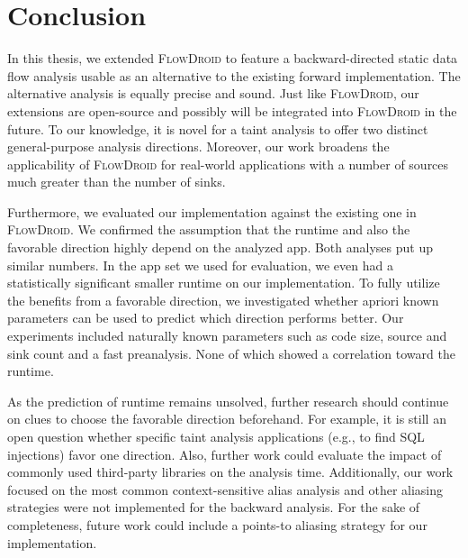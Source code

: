 \documentclass[../draft.tex]{subfiles}
\begin{document}
    \chapter{Conclusion}\label{c:conclusion}
    In this thesis, we extended \textsc{FlowDroid} to feature a backward-directed static data flow analysis usable as an alternative to the existing forward implementation.
    The alternative analysis is equally precise and sound.
    Just like \textsc{FlowDroid}, our extensions are open-source and possibly will be integrated into \textsc{FlowDroid} in the future.
    To our knowledge, it is novel for a taint analysis to offer two distinct general-purpose analysis directions.
    Moreover, our work broadens the applicability of \textsc{FlowDroid} for real-world applications with a number of sources much greater than the number of sinks.

    Furthermore, we evaluated our implementation against the existing one in \textsc{FlowDroid}.
    We confirmed the assumption that the runtime and also the favorable direction highly depend on the analyzed app.
    Both analyses put up similar numbers.
    In the app set we used for evaluation, we even had a statistically significant smaller runtime on our implementation.
    To fully utilize the benefits from a favorable direction, we investigated whether apriori known parameters can be used to predict which direction performs better.
    Our experiments included naturally known parameters such as code size, source and sink count and a fast preanalysis.
    None of which showed a correlation toward the runtime.

    As the prediction of runtime remains unsolved, further research should continue on clues to choose the favorable direction beforehand.
    For example, it is still an open question whether specific taint analysis applications (e.g., to find SQL injections) favor one direction.
    Also, further work could evaluate the impact of commonly used third-party libraries on the analysis time.
    Additionally, our work focused on the most common context-sensitive alias analysis and other aliasing strategies were not implemented for the backward analysis. 
    For the sake of completeness, future work could include a points-to aliasing strategy for our implementation.
\end{document}
